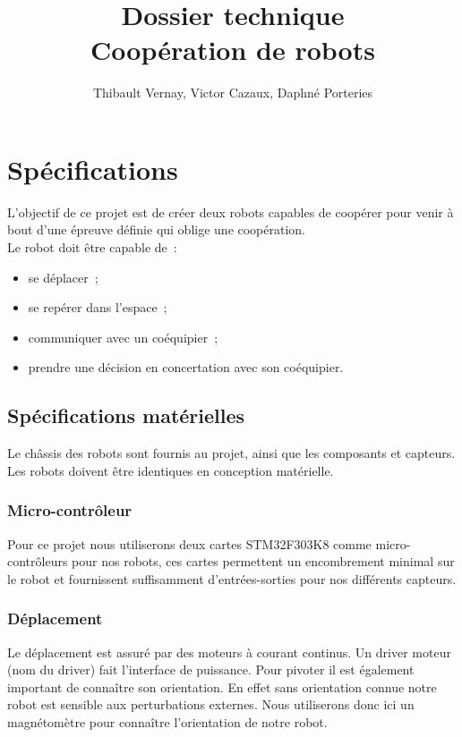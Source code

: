 \documentclass{article}
\title{Dossier technique\\Coopération de robots}
\author{Thibault Vernay, Victor Cazaux, Daphné Porteries}
\begin{document}
\maketitle

\tableofcontents

\section{Spécifications}

L'objectif de ce projet est de créer deux robots capables de coopérer pour venir à bout d'une épreuve définie qui oblige une coopération. \\

Le robot doit être capable de~: \\

\begin{itemize}
  \item se déplacer~;
  \item se repérer dans l'espace~;
  \item communiquer avec un coéquipier~;
  \item prendre une décision en concertation avec son coéquipier.
\end{itemize}

\subsection{Spécifications matérielles}

Le châssis des robots sont fournis au projet, ainsi que les composants et capteurs. Les robots doivent être identiques en conception matérielle.

\subsubsection{Micro-contrôleur}

Pour ce projet nous utiliserons deux cartes STM32F303K8 comme micro-contrôleurs pour nos robots, ces cartes permettent un encombrement minimal sur le robot et fournissent suffisamment d’entrées-sorties pour nos différents capteurs.

\subsubsection{Déplacement}

Le déplacement est assuré par des moteurs à courant continus. Un driver moteur (nom du driver) fait l'interface de puissance. Pour pivoter il est également important de connaître son orientation. En effet sans orientation connue notre robot est sensible aux perturbations externes. Nous utiliserons donc ici un magnétomètre pour connaître l’orientation de notre robot.
\end{document}
